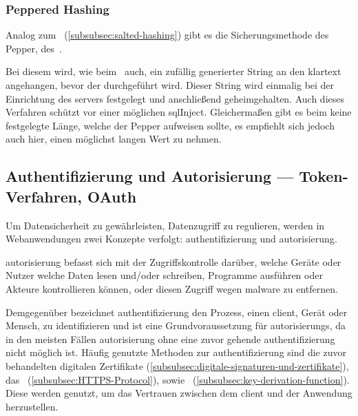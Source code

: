 \subsubsection{Peppered Hashing}\label{subsubsec:peppered-hashing}

Analog zum\  (\autoref{subsubsec:salted-hashing}) gibt es die Sicherungsmethode des Pepper, \bzw des\ .

Bei diesem wird, wie beim\  auch, ein zufällig generierter String an den \gls{klartext} angehangen, bevor der  durchgeführt wird.
Dieser String wird einmalig bei der Einrichtung des \glspl{server} festgelegt und anschließend geheimgehalten\autocite[\vglf][]{Securing39:online}.
Auch dieses Verfahren schützt vor einer möglichen \gls{sqlInject}.
Gleichermaßen gibt es beim keine festgelegte Länge, welche der Pepper aufweisen sollte, es empfiehlt sich jedoch auch hier, einen möglichst langen Wert zu nehmen.


\subsection[Authentifizierung und Autorisierung]{Authentifizierung und Autorisierung — Token-Verfahren, OAuth}\label{subsec:authenticationAuthorization}
Um Datensicherheit zu gewährleisten, \bzw Datenzugriff zu regulieren, werden in Webanwendungen zwei Konzepte verfolgt: \gls{authentifizierung} und \gls{autorisierung}.

\gls{autorisierung} befasst sich mit der Zugriffskontrolle darüber, welche Geräte oder Nutzer welche Daten lesen und/oder schreiben, Programme ausführen oder Akteure kontrollieren können\autocite[\vglf][]{Auth:2017}, oder diesen Zugriff \zb wegen \gls{malware} zu entfernen.\autocite[\vglf][]{Auth:2017}

Demgegenüber bezeichnet \gls{authentifizierung} den Prozess, einen \gls{client}, Gerät oder Mensch, zu identifizieren und ist eine Grundvoraussetzung für \glspl{autorisierung}, da in den meisten Fällen \gls{autorisierung} ohne eine zuvor gehende \gls{authentifizierung} nicht möglich ist.\autocite[\vglf][]{Auth:2017}
Häufig genutzte Methoden zur \gls{authentifizierung} sind die zuvor behandelten digitalen Zertifikate (\autoref{subsubsec:digitale-signaturen-und-zertifikate}), das\  (\autoref{subsubsec:HTTPS-Protocol}), sowie\  (\autoref{subsubsec:key-derivation-function}).
Diese werden genutzt, um das Vertrauen zwischen dem \gls{client} und der Anwendung herzustellen.\autocite[\vglf][]{Auth:2017}

